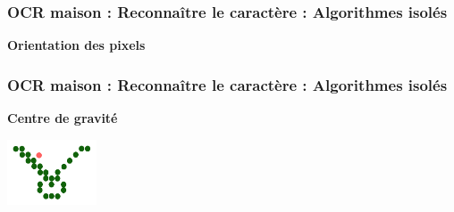 \documentclass[xcolor=dvipsnames]{beamer}
\begin{document}
\begin{frame}
  \frametitle{OCR maison : Reconnaître le caractère : Algorithmes isolés}

  \begin{center}\begin{alertblock}{}
    \begin{center}\textbf{\Large Orientation des pixels}\end{center}
  \end{alertblock}\end{center}

\end{frame}


\begin{frame}
  \frametitle{OCR maison : Reconnaître le caractère : Algorithmes isolés}

  \begin{center}\begin{alertblock}{}
    \begin{center}\textbf{\Large Centre de gravité}\end{center}
  \end{alertblock}\end{center}

  \begin{center}
    \includegraphics[width=100px]{chmoll-gravity.png}
    
  \end{center}

\end{frame}
\end{document}
